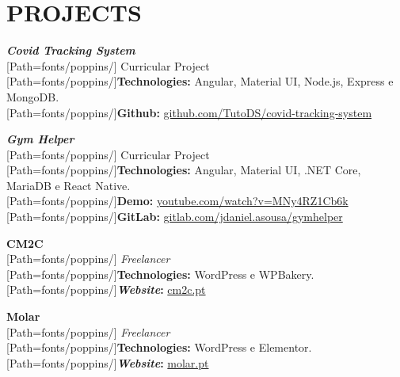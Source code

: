 \section*{\MakeUppercase{Projects}}

\begin{minipage}[t]{.4\textwidth}
\textbf{\textit{Covid Tracking System}}\\
{
	\scriptsize
	[Path=fonts/poppins/]
	Curricular Project\\
	{[Path=fonts/poppins/]\textbf{Technologies:}} Angular, Material UI, Node.js, Express e MongoDB.\\
	{[Path=fonts/poppins/]\textbf{Github:}} \href{https://github.com/TutoDS/covid-tracking-system}{github.com/TutoDS/covid-tracking-system}
}
\end{minipage}\hspace{0.1\textwidth}
\begin{minipage}[t]{.4\textwidth}
\textbf{\textit{Gym Helper}}\\
{
	\scriptsize
	[Path=fonts/poppins/]
	Curricular Project\\
	{[Path=fonts/poppins/]\textbf{Technologies:}} Angular, Material UI, .NET Core, MariaDB e React Native.\\
	{[Path=fonts/poppins/]\textbf{Demo:}} \href{https://www.youtube.com/watch?v=MNy4RZ1Cb6k}{youtube.com/watch?v=MNy4RZ1Cb6k}\\
	{[Path=fonts/poppins/]\textbf{GitLab:}} \href{https://gitlab.com/jdaniel.asousa/gymhelper}{gitlab.com/jdaniel.asousa/gymhelper}
}
\end{minipage}

\vspace{10pt}

\begin{minipage}[t]{.4\textwidth}
\textbf{CM2C}\\
{
	\scriptsize
	[Path=fonts/poppins/]
	\textit{Freelancer}\\
	{[Path=fonts/poppins/]\textbf{Technologies:}} WordPress e WPBakery.\\
	{[Path=fonts/poppins/]\textbf{\textit{Website}:}} \href{https://cm2c.pt}{cm2c.pt}
}
\end{minipage}\hspace{0.1\textwidth}
\begin{minipage}[t]{.4\textwidth}
\textbf{Molar}\\
{
	\scriptsize
	[Path=fonts/poppins/]
	\textit{Freelancer}\\
	{[Path=fonts/poppins/]\textbf{Technologies:}} WordPress e Elementor.\\
	{[Path=fonts/poppins/]\textbf{\textit{Website}:}} \href{https://molar.pt}{molar.pt}
}
\end{minipage}

